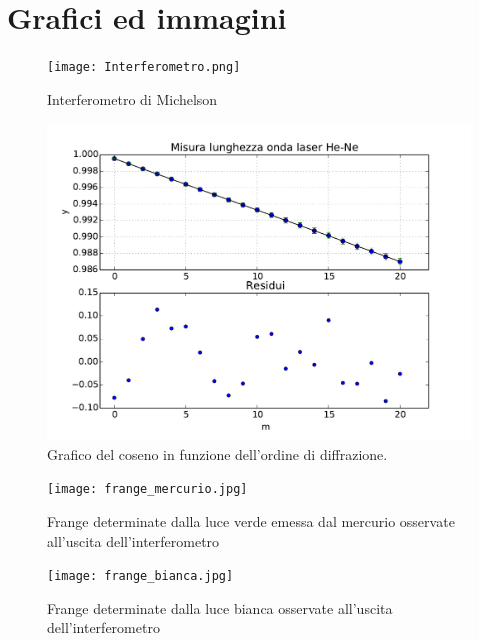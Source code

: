 \section{Grafici ed immagini}
\begin{figure}[h]
	\centering
	\texttt{[image: Interferometro.png]}
	\caption{Interferometro di Michelson}
	\label{f:figura_1}
\end{figure}
\begin{figure}[h]
	\centering
	\includegraphics[scale=0.8]{grafico.pdf}
	\caption{Grafico del coseno in funzione dell'ordine di diffrazione.}
           \label{f:figura_2}
\end{figure}

\begin{figure}[h]
	\centering
	\texttt{[image: frange\_mercurio.jpg]}
	\caption{Frange determinate dalla luce verde emessa dal mercurio osservate all'uscita dell'interferometro}
           \label{f:frange_mercurio}
\end{figure}

\begin{figure}[h]
	\centering
	\texttt{[image: frange\_bianca.jpg]}
	\caption{Frange determinate dalla luce bianca osservate all'uscita dell'interferometro}
           \label{f:frange_bianca}
\end{figure}